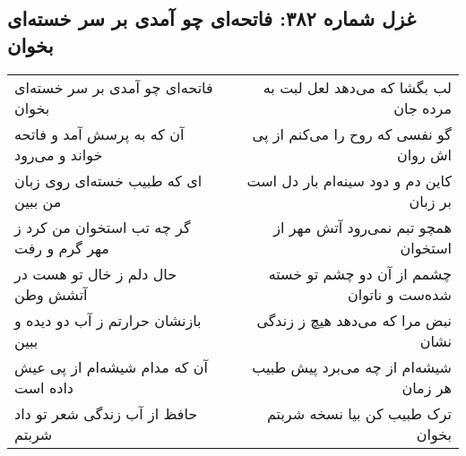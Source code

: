\begin{center}
\section*{غزل شماره ۳۸۲: فاتحه‌ای چو آمدی بر سر خسته‌ای بخوان}
\label{sec:sh382}
\begin{longtable}{l p{0.5cm} r}
فاتحه‌ای چو آمدی بر سر خسته‌ای بخوان
&&
لب بگشا که می‌دهد لعل لبت به مرده جان
\\
آن که به پرسش آمد و فاتحه خواند و می‌رود
&&
گو نفسی که روح را می‌کنم از پی اش روان
\\
ای که طبیب خسته‌ای روی زبان من ببین
&&
کاین دم و دود سینه‌ام بار دل است بر زبان
\\
گر چه تب استخوان من کرد ز مهر گرم و رفت
&&
همچو تبم نمی‌رود آتش مهر از استخوان
\\
حال دلم ز خال تو هست در آتشش وطن
&&
چشمم از آن دو چشم تو خسته شده‌ست و ناتوان
\\
بازنشان حرارتم ز آب دو دیده و ببین
&&
نبض مرا که می‌دهد هیچ ز زندگی نشان
\\
آن که مدام شیشه‌ام از پی عیش داده است
&&
شیشه‌ام از چه می‌برد پیش طبیب هر زمان
\\
حافظ از آب زندگی شعر تو داد شربتم
&&
ترک طبیب کن بیا نسخه شربتم بخوان
\\
\end{longtable}
\end{center}
